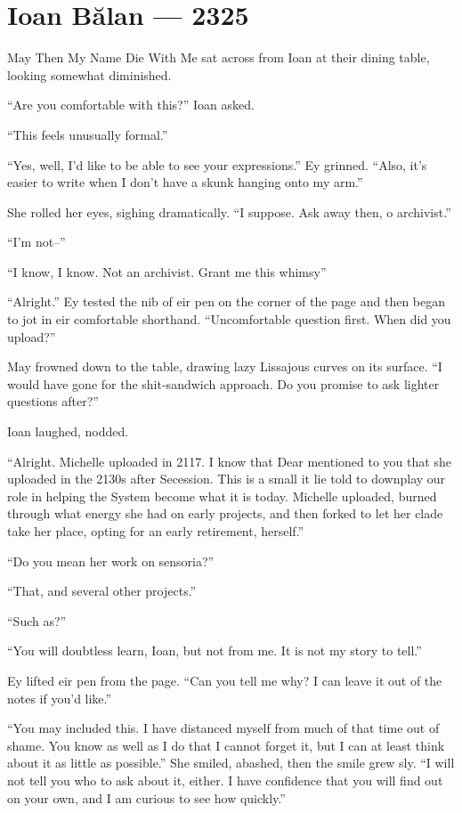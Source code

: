 \hypertarget{ioan-bux103lan-2325}{%
\chapter{Ioan Bălan — 2325}\label{ioan-bux103lan-2325}}

May Then My Name Die With Me sat across from Ioan at their dining table, looking somewhat diminished.

``Are you comfortable with this?'' Ioan asked.

``This feels unusually formal.''

``Yes, well, I'd like to be able to see your expressions.'' Ey grinned. ``Also, it's easier to write when I don't have a skunk hanging onto my arm.''

She rolled her eyes, sighing dramatically. ``I suppose. Ask away then, o archivist.''

``I'm not--''

``I know, I know. Not an archivist. Grant me this whimsy''

``Alright.'' Ey tested the nib of eir pen on the corner of the page and then began to jot in eir comfortable shorthand. ``Uncomfortable question first. When did you upload?''

May frowned down to the table, drawing lazy Lissajous curves on its surface. ``I would have gone for the shit-sandwich approach. Do you promise to ask lighter questions after?''

Ioan laughed, nodded.

``Alright. Michelle uploaded in 2117. I know that Dear mentioned to you that she uploaded in the 2130s after Secession. This is a small it lie told to downplay our role in helping the System become what it is today. Michelle uploaded, burned through what energy she had on early projects, and then forked to let her clade take her place, opting for an early retirement, herself.''

``Do you mean her work on sensoria?''

``That, and several other projects.''

``Such as?''

``You will doubtless learn, Ioan, but not from me. It is not my story to tell.''

Ey lifted eir pen from the page. ``Can you tell me why? I can leave it out of the notes if you'd like.''

``You may included this. I have distanced myself from much of that time out of shame. You know as well as I do that I cannot forget it, but I can at least think about it as little as possible.'' She smiled, abashed, then the smile grew sly. ``I will not tell you who to ask about it, either. I have confidence that you will find out on your own, and I am curious to see how quickly.''

